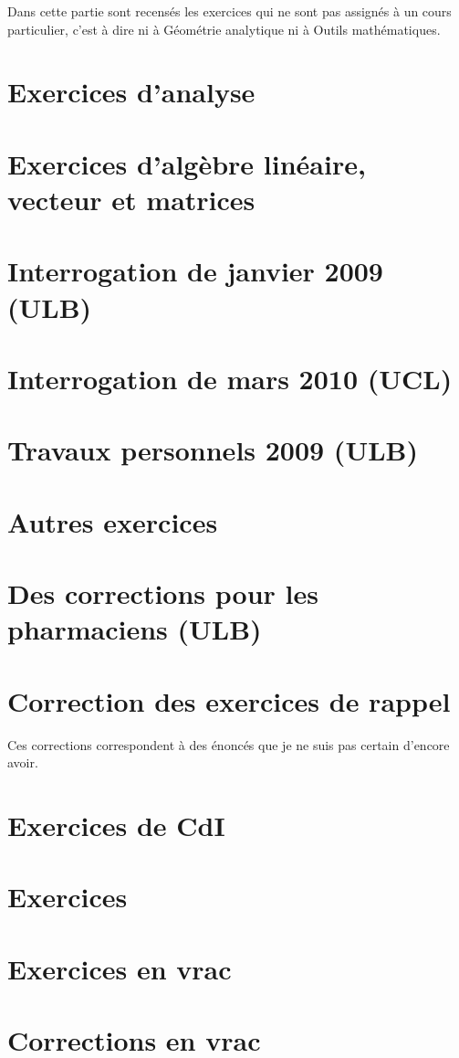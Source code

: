 Dans cette partie sont recensés les exercices qui ne sont pas assignés à un cours particulier, c'est à dire ni à Géométrie analytique ni à Outils mathématiques.

\chapter{Exercices d'analyse}




\chapter{Exercices d'algèbre linéaire, vecteur et matrices}


\chapter{Interrogation de janvier 2009 (ULB)}


\chapter{Interrogation de mars 2010 (UCL)}


\chapter{Travaux personnels 2009 (ULB)}


\chapter{Autres exercices}


\chapter{Des corrections pour les pharmaciens (ULB)}


\chapter{Correction des exercices de rappel}    %
Ces corrections correspondent à des énoncés que je ne suis pas certain d'encore avoir.


\chapter{Exercices de CdI}

\chapter{Exercices}
	
	

\chapter{Exercices en vrac} %



 
\chapter{Corrections en vrac}   %



